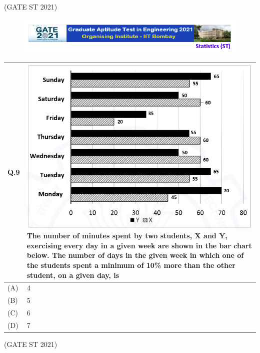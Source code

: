 \documentclass[journal,12pt,onecolumn]{IEEEtran}
\theoremstyle{remark}
\begin{document}
\bigskip
\hfill (GATE ST 2021)

\newpage
\begin{figure}
\huge\centering
    \includegraphics[width=1\linewidth]{figs/0.png}
\end{figure}

\begin{tabular}{|p{1cm}|p{12.5cm}|}

\hline

\textbf{Q.9} & \includegraphics[width=1\linewidth]{figs/4.png}
\textbf{The number of minutes spent by two students, X and Y, exercising every day in a given week are shown in the bar chart below.}
\textbf{The number of days in the given week in which one of the students spent a minimum of 10\% more than the other student, on a given day, is}
\bigskip \\
\hline
(A) & 4 \\
\hline
(B) & 5 \\
\hline
(C) & 6 \\
\hline
(D) & 7 \\
\hline
\end{tabular}

\bigskip
\hfill (GATE ST 2021)
\\
\end{document}

